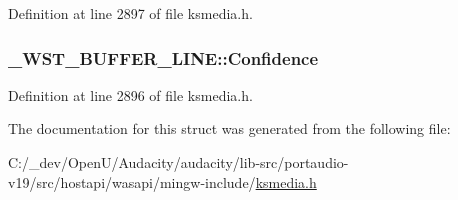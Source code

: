Definition at line 2897 of file ksmedia.\+h.

\subsubsection[{\texorpdfstring{Confidence}{Confidence}}]{ \+\_\+\+W\+S\+T\+\_\+\+B\+U\+F\+F\+E\+R\+\_\+\+L\+I\+N\+E\+::\+Confidence}\hypertarget{struct___w_s_t___b_u_f_f_e_r___l_i_n_e_aff2cd1c7844a9c14e1c50a7e9362e640}{}\label{struct___w_s_t___b_u_f_f_e_r___l_i_n_e_aff2cd1c7844a9c14e1c50a7e9362e640}


Definition at line 2896 of file ksmedia.\+h.



The documentation for this struct was generated from the following file\+:\begin{DoxyCompactItemize}
\item 
C\+:/\+\_\+dev/\+Open\+U/\+Audacity/audacity/lib-\/src/portaudio-\/v19/src/hostapi/wasapi/mingw-\/include/\hyperlink{ksmedia_8h}{ksmedia.\+h}\end{DoxyCompactItemize}
